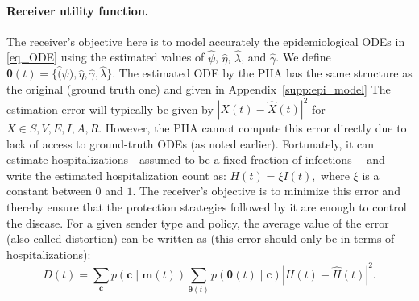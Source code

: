 \documentclass[sigconf,review]{acmart}
\newcommand{\abs}[1]{\left| #1 \right|}
\begin{document}
\paragraph{Receiver utility function.}
The receiver's objective here is to model accurately the epidemiological ODEs in \eqref{eq_ODE} using the estimated values of $\hat{\psi}$, $\hat{\eta}$, $\hat{\lambda}$, and $\hat{\gamma}$. We define $\boldsymbol{\theta}(t) = \{\hat(\psi),\hat{\eta},\hat{\gamma},\hat{\lambda}\}$. The estimated ODE by the PHA
has the same structure as the original (ground truth one) and given in Appendix~\ref{supp:epi_model}
The estimation error will typically be given by $\abs{X(t) - \hat{X}(t)}^2$ for $X \in {S,V,E,I,A,R}$. However, the PHA cannot compute this error directly due to lack of access to ground-truth ODEs (as noted earlier). Fortunately, it can estimate hospitalizations—assumed to be a fixed fraction of infections \cite{FoxPNAS2022}—and write the estimated hospitalization count as:
$
    H(t) = \xi I(t),
$
where $\xi$ is a constant between $0$  and $1$.
The receiver's objective is to minimize this error and thereby ensure that the protection strategies followed by it are enough to control the disease. For a given sender type and policy, the average value of the error (also called distortion) can be written as (this error should only be in terms of hospitalizations):
\begin{equation}
    D(t) = \sum\limits_{\boldsymbol{c}} p(\boldsymbol{c} \mid \boldsymbol{m}(t)) 
    \sum\limits_{\boldsymbol{\theta}(t)} p(\boldsymbol{\theta}(t) \mid \boldsymbol{c}) 
    \left| H(t) - \widehat{H}(t) \right|^2.\label{eq_error}
\end{equation}
\end{document}
